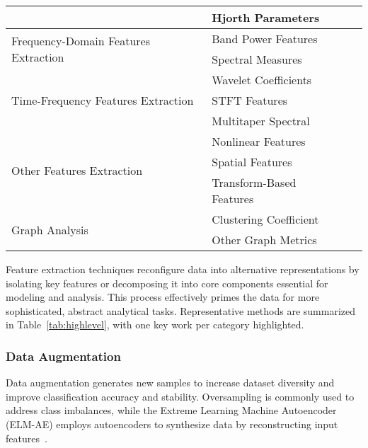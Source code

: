\begin{table}[t]
\begin{tabular}{p{80pt}p{90pt}p{30pt}}
                                       & Hjorth Parameters                & ~\cite{li2019depression}             \\
\hline
\multirow{2}{80pt}{Frequency-Domain Features Extraction}  
                                       & Band Power Features              & ~\cite{Seizure67}        \\
                                       & Spectral Measures                & ~\cite{tosun2021effects}        \\
\hline
\multirow{3}{80pt}{Time-Frequency Features Extraction}  
                                       & Wavelet Coefficients             & ~\cite{aslan2022deep}           \\
                                       & STFT Features                    & ~\cite{choi2019novel}           \\
                                       & Multitaper Spectral              & ~\cite{vilamala2017deep}        \\
\hline
\multirow{3}{80pt}{Other Features Extraction}  
                                       & Nonlinear Features               & ~\cite{Seizure109}        \\
                                       & Spatial Features                 & ~\cite{phang2019multi} \\
                                       & Transform-Based Features         & ~\cite{electronics11142265} \\
\hline
\multirow{2}{80pt}{Graph Analysis}                                                         & Clustering Coefficient           & ~\cite{Zhan2020EpilepsyDetection}       \\
                                       & Other Graph Metrics              & ~\cite{ho2023self}   \\
\hline
\end{tabular}
\end{table}

Feature extraction techniques reconfigure data into alternative representations by isolating key features or decomposing it into core components essential for modeling and analysis. This process effectively primes the data for more sophisticated, abstract analytical tasks.
Representative methods are summarized in Table~\ref{tab:highlevel}, with one key work per category highlighted.

\subsubsection{Data Augmentation}
Data augmentation generates new samples to increase dataset diversity and improve classification accuracy and stability. Oversampling is commonly used to address class imbalances, while the Extreme Learning Machine Autoencoder (ELM-AE) employs autoencoders to synthesize data by reconstructing input features~\cite{9713847}.

